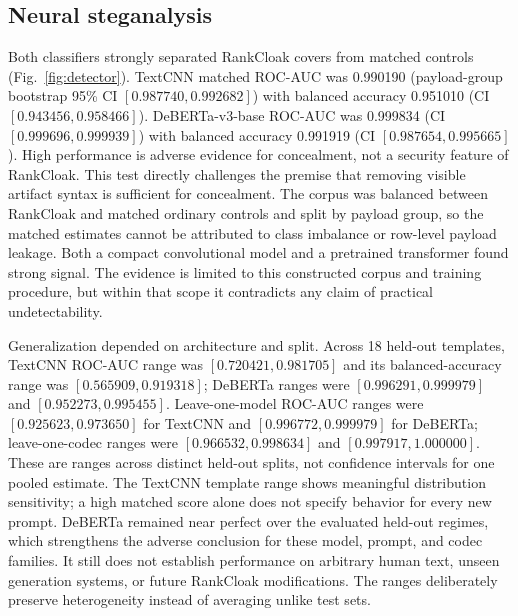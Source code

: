 \documentclass[fleqn,10pt]{wlscirep}
\begin{document}
\subsection*{Neural steganalysis}\label{sec:results-detector}

Both classifiers strongly separated RankCloak covers from matched controls (Fig.~\ref{fig:detector}). TextCNN matched ROC-AUC was 0.990190 (payload-group bootstrap 95\% CI \([0.987740,\allowbreak 0.992682]\)) with balanced accuracy 0.951010 (CI \([0.943456,\allowbreak 0.958466]\)). DeBERTa-v3-base ROC-AUC was 0.999834 (CI \([0.999696,\allowbreak 0.999939]\)) with balanced accuracy 0.991919 (CI \([0.987654,\allowbreak 0.995665]\)). High performance is adverse evidence for concealment, not a security feature of RankCloak.
This test directly challenges the premise that removing visible artifact syntax is sufficient for concealment. The corpus was balanced between RankCloak and matched ordinary controls and split by payload group, so the matched estimates cannot be attributed to class imbalance or row-level payload leakage. Both a compact convolutional model and a pretrained transformer found strong signal. The evidence is limited to this constructed corpus and training procedure, but within that scope it contradicts any claim of practical undetectability.

Generalization depended on architecture and split. Across 18 held-out templates, TextCNN ROC-AUC range was \([0.720421,\allowbreak 0.981705]\) and its balanced-accuracy range was \([0.565909,\allowbreak 0.919318]\); DeBERTa ranges were \([0.996291,\allowbreak 0.999979]\) and \([0.952273,\allowbreak 0.995455]\). Leave-one-model ROC-AUC ranges were \([0.925623,\allowbreak 0.973650]\) for TextCNN and \([0.996772,\allowbreak 0.999979]\) for DeBERTa; leave-one-codec ranges were \([0.966532,\allowbreak 0.998634]\) and \([0.997917,\allowbreak 1.000000]\). These are ranges across distinct held-out splits, not confidence intervals for one pooled estimate.
The TextCNN template range shows meaningful distribution sensitivity; a high matched score alone does not specify behavior for every new prompt. DeBERTa remained near perfect over the evaluated held-out regimes, which strengthens the adverse conclusion for these model, prompt, and codec families. It still does not establish performance on arbitrary human text, unseen generation systems, or future RankCloak modifications. The ranges deliberately preserve heterogeneity instead of averaging unlike test sets.
\end{document}
